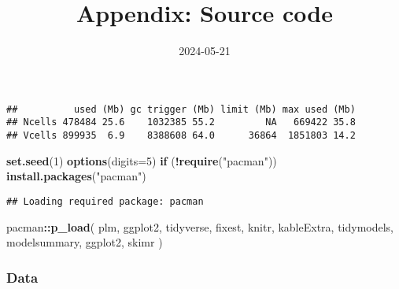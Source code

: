 \documentclass[
]{article}
\title{Appendix: Source code}
\author{}
\date{\vspace{-2.5em}2024-05-21}
\newenvironment{Shaded}{\begin{snugshade}}{\end{snugshade}}
\newcommand{\AttributeTok}[1]{\textcolor[rgb]{0.13,0.29,0.53}{#1}}
\newcommand{\ConstantTok}[1]{\textcolor[rgb]{0.56,0.35,0.01}{#1}}
\newcommand{\ControlFlowTok}[1]{\textcolor[rgb]{0.13,0.29,0.53}{\textbf{#1}}}
\newcommand{\DecValTok}[1]{\textcolor[rgb]{0.00,0.00,0.81}{#1}}
\newcommand{\FunctionTok}[1]{\textcolor[rgb]{0.13,0.29,0.53}{\textbf{#1}}}
\newcommand{\NormalTok}[1]{#1}
\newcommand{\SpecialCharTok}[1]{\textcolor[rgb]{0.81,0.36,0.00}{\textbf{#1}}}
\newcommand{\StringTok}[1]{\textcolor[rgb]{0.31,0.60,0.02}{#1}}
\begin{document}
\maketitle

\begin{Shaded}
\end{Shaded}

\begin{verbatim}
##          used (Mb) gc trigger (Mb) limit (Mb) max used (Mb)
## Ncells 478484 25.6    1032385 55.2         NA   669422 35.8
## Vcells 899935  6.9    8388608 64.0      36864  1851803 14.2
\end{verbatim}

\begin{Shaded}
\begin{Highlighting}[]
\FunctionTok{set.seed}\NormalTok{(}\DecValTok{1}\NormalTok{)}
\FunctionTok{options}\NormalTok{(}\AttributeTok{digits=}\DecValTok{5}\NormalTok{) }
\ControlFlowTok{if}\NormalTok{ (}\SpecialCharTok{!}\FunctionTok{require}\NormalTok{(}\StringTok{"pacman"}\NormalTok{)) }\FunctionTok{install.packages}\NormalTok{(}\StringTok{"pacman"}\NormalTok{)}
\end{Highlighting}
\end{Shaded}

\begin{verbatim}
## Loading required package: pacman
\end{verbatim}

\begin{Shaded}
\begin{Highlighting}[]
\NormalTok{pacman}\SpecialCharTok{::}\FunctionTok{p\_load}\NormalTok{(}
\NormalTok{  plm,}
\NormalTok{  ggplot2,}
\NormalTok{  tidyverse,}
\NormalTok{  fixest,}
\NormalTok{  knitr,}
\NormalTok{  kableExtra,}
\NormalTok{  tidymodels,}
\NormalTok{  modelsummary,}
\NormalTok{  ggplot2,}
\NormalTok{  skimr}
\NormalTok{)}
\end{Highlighting}
\end{Shaded}

\hypertarget{data}{%
\subsubsection{Data}\label{data}}
\end{document}
